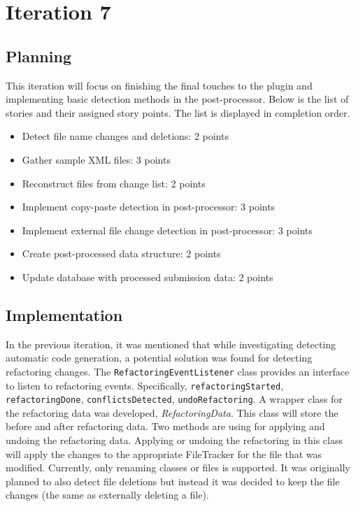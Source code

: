 \chapter{Iteration 7}
\section{Planning}
This iteration will focus on finishing the final touches to the plugin and implementing basic detection methods in the post-processor. Below is the list of stories and their assigned story points. The list is displayed in completion order.

\begin{itemize}
\item Detect file name changes and deletions: 2 points
\item Gather sample XML files: 3 points
\item Reconstruct files from change list: 2 points
\item Implement copy-paste detection in post-processor: 3 points
\item Implement external file change detection in post-processor: 3 points
\item Create post-processed data structure: 2 points
\item Update database with processed submission data: 2 points
\end{itemize}

\section{Implementation}
In the previous iteration, it was mentioned that while investigating detecting automatic code generation, a potential solution was found for detecting refactoring changes. The \texttt{RefactoringEventListener} class provides an interface to listen to refactoring events. Specifically, \texttt{refactoringStarted}, \texttt{refactoringDone}, \texttt{conflictsDetected}, \texttt{undoRefactoring}. A wrapper class for the refactoring data was developed, \textit{RefactoringData}. This class will store the before and after refactoring data. Two methods are using for applying and undoing the refactoring data. Applying or undoing the refactoring in this class will apply the changes to the appropriate FileTracker for the file that was modified. Currently, only renaming classes or files is supported. It was originally planned to also detect file deletions but instead it was decided to keep the file changes (the same as externally deleting a file).

